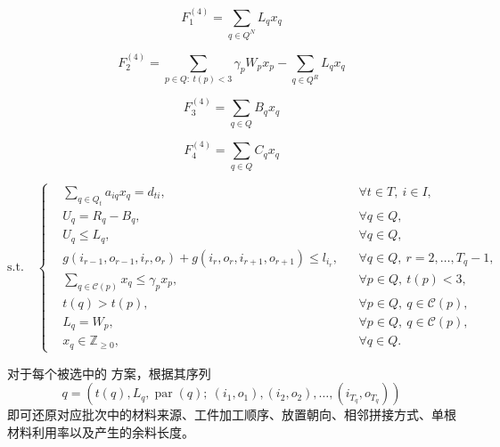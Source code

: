 \documentclass[UTF8]{ctexart}
\begin{document}
\begin{equation}
F_1^{(4)}=\sum_{q\in Q^N}L_qx_q
\label{eq:p4_F1_def}
\end{equation}

\begin{equation}
F_2^{(4)}=\sum_{p\in Q:\ t(p)<3}\gamma_p W_p x_p - \sum_{q\in Q^R}L_qx_q
\label{eq:p4_F2_def}
\end{equation}

\begin{equation}
F_3^{(4)}=\sum_{q\in Q}B_qx_q
\label{eq:p4_F3_def}
\end{equation}

\begin{equation}
F_4^{(4)}=\sum_{q\in Q}C_qx_q
\label{eq:p4_F4_def}
\end{equation}

\begin{equation}
\mathrm{s.t.}\quad
\left\{
\begin{aligned}
&\sum_{q\in Q_t}a_{iq}x_q=d_{ti},
&&\forall t\in T,\ i\in I,\\
&U_q=R_q-B_q,
&&\forall q\in Q,\\
&U_q\leq L_q,
&&\forall q\in Q,\\
&g(i_{r-1},o_{r-1},i_r,o_r)
 +
 g(i_r,o_r,i_{r+1},o_{r+1})
\leq l_{i_r},
&&\forall q\in Q,\ r=2,\ldots,T_q-1,\\
&\sum_{q\in\mathcal C(p)}x_q\leq \gamma_p x_p,
&&\forall p\in Q,\ t(p)<3,\\
&t(q)>t(p),
&&\forall p\in Q,\ q\in\mathcal C(p),\\
&L_q=W_p,
&&\forall p\in Q,\ q\in\mathcal C(p),\\
&x_q\in\mathbb{Z}_{\geq 0},
&&\forall q\in Q.
\end{aligned}
\right.
\end{equation}

对于每个被选中的 方案，根据其序列
\[
q=\left(t(q),L_q,\operatorname{par}(q);\ (i_1,o_1),(i_2,o_2),\ldots,(i_{T_q},o_{T_q})\right)
\]
即可还原对应批次中的材料来源、工件加工顺序、放置朝向、相邻拼接方式、单根材料利用率以及产生的余料长度。
\end{document}

